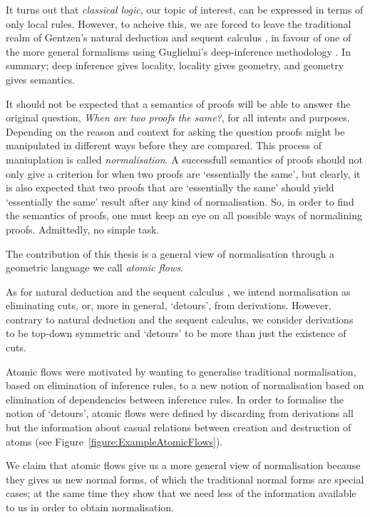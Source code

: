 It turns out that \emph{classical logic}, our topic of interest, can be expressed in terms of only local rules. However, to acheive this, we are forced \cite{} to leave the traditional realm of Gentzen's natural deduction and sequent calculus \cite{}, in favour of one of the more general formalisms using Guglielmi's deep-inference methodology \cite{}. In summary; deep inference gives locality, locality gives geometry, and geometry gives semantics.

It should not be expected that a semantics of proofs will be able to answer the original question, \emph{When are two proofs the same?}, for all intents and purposes. Depending on the reason and context for asking the question proofs might be manipulated in different ways before they are compared. This process of maniuplation is called \emph{normalisation}. A successfull semantics of proofs should not only give a criterion for when two proofs are `essentially the same', but clearly, it is also expected that two proofs that are `essentially the same' should yield `essentially the same' result after any kind of normalisation. So, in order to find the semantics of proofs, one must keep an eye on all possible ways of normalining proofs. Admittedly, no simple task.

The contribution of this thesis is a general view of normalisation through a geometric language we call \emph{atomic flows}.


As for natural deduction and the sequent calculus \cite{Gent:69:Investig:xi}, we intend normalisation as eliminating cuts, or, more in general, `detours', from derivations. However, contrary to natural deduction and the sequent calculus, we consider derivations to be top-down symmetric and `detours' to be more than just the existence of cuts.

Atomic flows were motivated by wanting to generalise traditional normalisation, based on elimination of inference rules, to a new notion of normalisation based on elimination of dependencies between inference rules. In order to formalise the notion of `detours', atomic flows were defined by discarding from derivations all but the information about casual relations between creation and destruction of atoms (see Figure~\vref{figure:ExampleAtomicFlows}).

We claim that atomic flows give us a more general view of normalisation because they gives us new normal forms, of which the traditional normal forms are special cases; at the same time they show that we need less of the information available to us in order to obtain normalisation.

